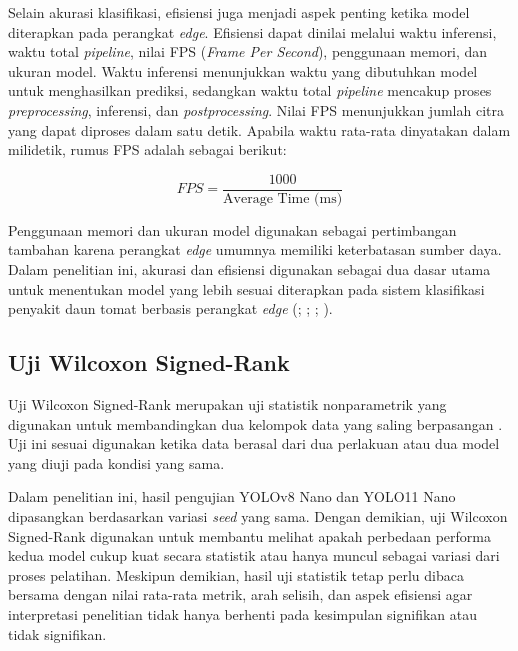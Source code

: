 \begin{sectioncontent}
\begin{subsectioncontent}
        Selain akurasi klasifikasi, efisiensi juga menjadi aspek penting ketika model diterapkan pada perangkat \textit{edge}. Efisiensi dapat dinilai melalui waktu inferensi, waktu total \textit{pipeline}, nilai FPS (\textit{Frame Per Second}), penggunaan memori, dan ukuran model. Waktu inferensi menunjukkan waktu yang dibutuhkan model untuk menghasilkan prediksi, sedangkan waktu total \textit{pipeline} mencakup proses \textit{preprocessing}, inferensi, dan \textit{postprocessing}. Nilai FPS menunjukkan jumlah citra yang dapat diproses dalam satu detik. Apabila waktu rata-rata dinyatakan dalam milidetik, rumus FPS adalah sebagai berikut:

        \begin{equation}
            FPS = \frac{1000}{\text{Average Time (ms)}}
        \end{equation}

        Penggunaan memori dan ukuran model digunakan sebagai pertimbangan tambahan karena perangkat \textit{edge} umumnya memiliki keterbatasan sumber daya. Dalam penelitian ini, akurasi dan efisiensi digunakan sebagai dua dasar utama untuk menentukan model yang lebih sesuai diterapkan pada sistem klasifikasi penyakit daun tomat berbasis perangkat \textit{edge} (\citealp[hlm. 71--74]{singh2023edge}; \citealp[hlm. 1--4]{gill2025taxonomy}; \citealp[hlm. 1--6]{xu2025edge}; \citealp[hlm. 10--13]{majeed2024edge}).
    \end{subsectioncontent}

    \subsection{Uji Wilcoxon Signed-Rank}
    \begin{subsectioncontent}
        \hspace{\parindent}Uji Wilcoxon Signed-Rank merupakan uji statistik nonparametrik yang digunakan untuk membandingkan dua kelompok data yang saling berpasangan \citep[hlm. 80--83]{wilcoxon1945individual}. Uji ini sesuai digunakan ketika data berasal dari dua perlakuan atau dua model yang diuji pada kondisi yang sama.

        Dalam penelitian ini, hasil pengujian YOLOv8 Nano dan YOLO11 Nano dipasangkan berdasarkan variasi \textit{seed} yang sama. Dengan demikian, uji Wilcoxon Signed-Rank digunakan untuk membantu melihat apakah perbedaan performa kedua model cukup kuat secara statistik atau hanya muncul sebagai variasi dari proses pelatihan. Meskipun demikian, hasil uji statistik tetap perlu dibaca bersama dengan nilai rata-rata metrik, arah selisih, dan aspek efisiensi agar interpretasi penelitian tidak hanya berhenti pada kesimpulan signifikan atau tidak signifikan.
    \end{subsectioncontent}



\end{sectioncontent}
